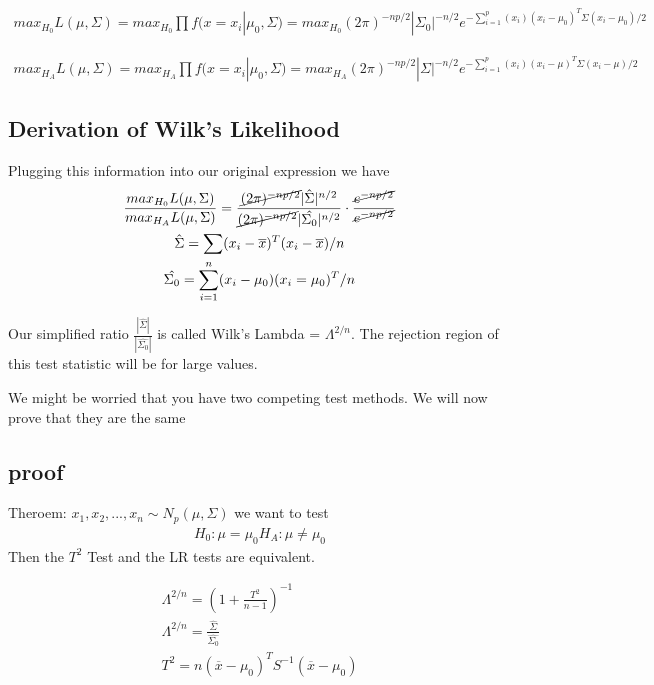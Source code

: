 \begin{gather*}
    max_{H_0}L(\mu,\Sigma) = max_{H_0}\displaystyle\prod f(x=x_i | \mu_0,\Sigma)=  max_{H_0} (2\pi)^{-np/2} |\Sigma_0 |^{-n/2} e^{-\displaystyle\sum_{i=1}^{p}(x_i) (x_i-\mu_0)^T \Sigma (x_i-\mu_0)/2}
\end{gather*}

\begin{gather*}
    max_{H_A}L(\mu,\Sigma) = max_{H_A}\displaystyle\prod f(x=x_i | \mu_0,\Sigma) = max_{H_A} (2\pi)^{-np/2} |\Sigma|^{-n/2} e^{-\displaystyle\sum_{i=1}^{p}(x_i) (x_i-\mu)^T \Sigma (x_i-\mu)/2}
\end{gather*}

\subsection{Derivation of Wilk's Likelihood}
Plugging this information into our original expression we have
\begin{gather*}
    \frac{max_{H_0}L(\mu,\Sigma)}{max_{H_A}L(\mu,\Sigma)} = 
    \frac{\cancel{(2\pi)^{-np/2}} |\hat{\Sigma}|^{n/2}}
    {\cancel{(2\pi)^{-np/2}}|\hat{\Sigma_0}|^{n/2}} \cdot \frac{\cancel{e^{-np/2}}}{\cancel{e^{-np/2}}} \\
    \hat{\Sigma} = \sum(x_i-\overline{x})^T(x_i-\overline{x})/n\\
    \hat{\Sigma_0} = \sum_{i=1}^n(x_i-\mu_0)(x_i=\mu_0)^T/n
\end{gather*}

Our simplified ratio $\frac{|\hat{\Sigma}|}{|\hat{\Sigma_0}|}$ is called Wilk's Lambda = $\Lambda^{2/n}$.
The rejection region of this test statistic will be for large values.

We might be worried that you have two competing test methods. We will now prove that they are the same

\subsection*{proof}
Theroem: $x_1,x_2,...,x_n\sim N_p(\mu,\Sigma)$ we want to test 
\begin{gather*}
    H_0: \mu = \mu_0
    H_A: \mu \neq \mu_0
\end{gather*}
Then the $T^2$ Test and the LR tests are equivalent.

\begin{gather*}
    \Lambda^{2/n} = (1+\frac{T^2}{n-1})^{-1} \\
    \Lambda^{2/n} = \frac{\hat{\Sigma}}{\hat{\Sigma_0}}\\
    T^2 = n(\overline{x}-\mu_0)^TS^{-1}(\overline{x}-\mu_0)
\end{gather*}

